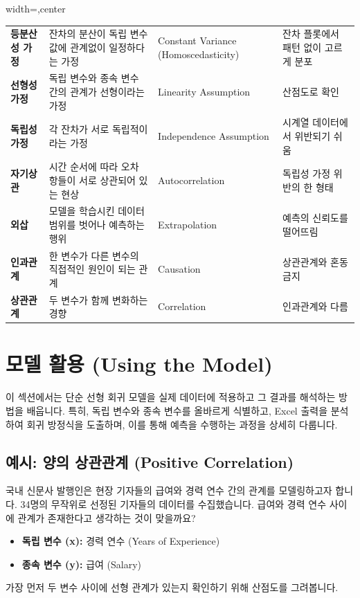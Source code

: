 \documentclass[11pt,a4paper]{article}
\begin{document}
\begin{adjustbox}{width=\textwidth,center}
\begin{tabular}{llll}
\textbf{등분산성 가정} & 잔차의 분산이 독립 변수 값에 관계없이 일정하다는 가정 & Constant Variance (Homoscedasticity) & 잔차 플롯에서 패턴 없이 고르게 분포 \\
\textbf{선형성 가정} & 독립 변수와 종속 변수 간의 관계가 선형이라는 가정 & Linearity Assumption & 산점도로 확인 \\
\textbf{독립성 가정} & 각 잔차가 서로 독립적이라는 가정 & Independence Assumption & 시계열 데이터에서 위반되기 쉬움 \\
\textbf{자기상관} & 시간 순서에 따라 오차 항들이 서로 상관되어 있는 현상 & Autocorrelation & 독립성 가정 위반의 한 형태 \\
\textbf{외삽} & 모델을 학습시킨 데이터 범위를 벗어나 예측하는 행위 & Extrapolation & 예측의 신뢰도를 떨어뜨림 \\
\textbf{인과관계} & 한 변수가 다른 변수의 직접적인 원인이 되는 관계 & Causation & 상관관계와 혼동 금지 \\
\textbf{상관관계} & 두 변수가 함께 변화하는 경향 & Correlation & 인과관계와 다름 \\
\bottomrule
\end{tabular}
\end{adjustbox}

\newpage
\section{모델 활용 (Using the Model)}
이 섹션에서는 단순 선형 회귀 모델을 실제 데이터에 적용하고 그 결과를 해석하는 방법을 배웁니다. 특히, 독립 변수와 종속 변수를 올바르게 식별하고, Excel 출력을 분석하여 회귀 방정식을 도출하며, 이를 통해 예측을 수행하는 과정을 상세히 다룹니다.

\subsection{예시: 양의 상관관계 (Positive Correlation)}
국내 신문사 발행인은 현장 기자들의 급여와 경력 연수 간의 관계를 모델링하고자 합니다. 34명의 무작위로 선정된 기자들의 데이터를 수집했습니다. 급여와 경력 연수 사이에 관계가 존재한다고 생각하는 것이 맞을까요?

\begin{itemize}
    \item \textbf{독립 변수 (x):} 경력 연수 (Years of Experience)
    \item \textbf{종속 변수 (y):} 급여 (Salary)
\end{itemize}
가장 먼저 두 변수 사이에 선형 관계가 있는지 확인하기 위해 산점도를 그려봅니다.
\end{document}
